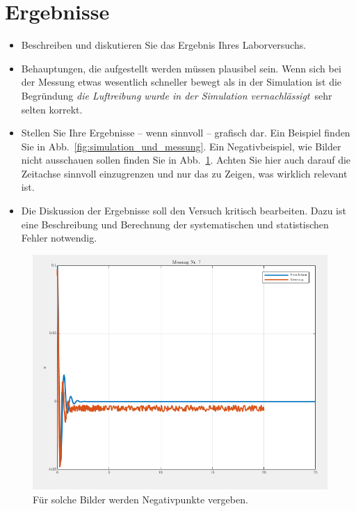 \section*{Ergebnisse}
\begin{itemize}
    \item Beschreiben und diskutieren Sie das Ergebnis Ihres Laborversuchs.
    \item Behauptungen, die aufgestellt werden müssen plausibel sein. Wenn sich bei der Messung etwas wesentlich schneller bewegt als in der Simulation ist die Begründung \glqq \textit{die Luftreibung wurde in der Simulation vernachlässigt}\grqq \ sehr selten korrekt.
    \item Stellen Sie Ihre Ergebnisse -- wenn sinnvoll -- grafisch dar. Ein Beispiel finden Sie in Abb.~\ref{fig:simulation_und_messung}. Ein Negativbeispiel, wie Bilder nicht ausschauen sollen finden Sie in Abb.~\ref{fig:negativbeispiel}. Achten Sie hier auch darauf die Zeitachse sinnvoll einzugrenzen und nur das zu Zeigen, was wirklich relevant ist.
    \item Die Diskussion der Ergebnisse soll den Versuch kritisch bearbeiten. Dazu ist eine Beschreibung und Berechnung der systematischen und statistischen Fehler notwendig.
\end{itemize}


\begin{figure}[t]
	\centering
	\includegraphics[width=0.95\linewidth]{images/Negativbeispiel}
	\caption{Für solche Bilder werden Negativpunkte vergeben.}	   	
	\label{fig:negativbeispiel}
\end{figure}